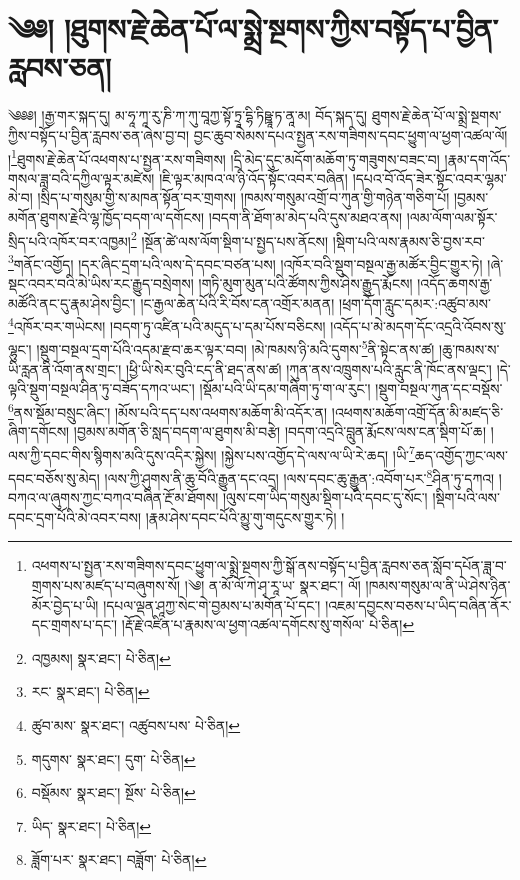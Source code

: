 \setcounter{footnote}{0} 
\chapter{༄༅། །ཐུགས་རྗེ་ཆེན་པོ་ལ་སྨྲེ་སྔགས་ཀྱིས་བསྟོད་པ་བྱིན་རླབས་ཅན།}༄༅༅། །རྒྱ་གར་སྐད་དུ། མ་ཧཱ་ཀཱ་རུ་ཎི་ཀ་ཀུ་བཱཀྱ་སྟོ་ཏྲཱ་དྷི་ཏིཥྛཱ་ཏ་ནཱ་མ། བོད་སྐད་དུ། ཐུགས་རྗེ་ཆེན་པོ་ལ་སྨྲེ་སྔགས་ཀྱིས་བསྟོད་པ་བྱིན་རླབས་ཅན་ཞེས་བྱ་བ། བྱང་ཆུབ་སེམས་དཔའ་སྤྱན་རས་གཟིགས་དབང་ཕྱུག་ལ་ཕྱག་འཚལ་ལོ། །\footnote{འཕགས་པ་སྤྱན་རས་གཟིགས་དབང་ཕྱུག་ལ་སྨྲེ་སྔགས་ཀྱི་སྒོ་ནས་བསྟོད་པ་བྱིན་རླབས་ཅན་སློབ་དཔོན་ཟླ་བ་གྲགས་པས་མཛད་པ་བཞུགས་སོ། །༄། ན་མོ་ལོ་ཀེ་ཤྭ་རཱ་ཡ་  སྣར་ཐང་། ལོ། །ཁམས་གསུམ་ལ་ནི་ཡེ་ཤེས་ཉིན་མོར་བྱེད་པ་ཡི། །དཔལ་ལྡན་ཤཱཀྱ་སེང་གེ་བྱམས་པ་མགོན་པོ་དང་། །འཇམ་དབྱངས་བཅས་པ་ཡིད་བཞིན་ནོར་དང་གྲགས་པ་དང་། །རྡོ་རྗེ་འཛིན་པ་རྣམས་ལ་ཕྱག་འཚལ་དགོངས་སུ་གསོལ་  པེ་ཅིན། }ཐུགས་རྗེ་ཆེན་པོ་འཕགས་པ་སྤྱན་རས་གཟིགས། །དྲི་མེད་དུང་མདོག་མཆོག་ཏུ་གཟུགས་བཟང་བ། །རྣམ་དག་འོད་གསལ་ཟླ་བའི་དཀྱིལ་ལྟར་མཛེས། །ཇི་ལྟར་མཁའ་ལ་ཉི་འོད་སྟོང་འབར་བཞིན། །དཔའ་བོ་འོད་ཟེར་སྟོང་འབར་ལྷམ་མེ་བ། །སྲིད་པ་གསུམ་གྱི་ས་མཁན་སྟོན་བར་གྲགས། །ཁམས་གསུམ་འགྲོ་བ་ཀུན་གྱི་གཉེན་གཅིག་པོ། །བྱམས་མགོན་ཐུགས་རྗེའི་ལྷ་ཁྱོད་བདག་ལ་དགོངས། །བདག་ནི་ཐོག་མ་མེད་པའི་དུས་མཐའ་ནས། །ལམ་ལོག་ལམ་སྟོར་སྲིད་པའི་འཁོར་བར་འཁྱམ།\footnote{འཁྱམས།  སྣར་ཐང་།  པེ་ཅིན། } །སྔོན་ཚེ་ལས་ལོག་སྡིག་པ་སྤྱད་པས་ནོངས། །སྡིག་པའི་ལས་རྣམས་ཅི་བྱས་རབ་\footnote{རང་  སྣར་ཐང་།  པེ་ཅིན། }གནོང་འགྱོད། །དར་ཞིང་དྲག་པའི་ལས་དེ་དབང་བཙན་པས། །འཁོར་བའི་སྡུག་བསྔལ་རྒྱ་མཚོར་བྱིང་གྱུར་ཏེ། །ཞེ་སྡང་འབར་བའི་མེ་ཡིས་རང་རྒྱུད་བསྲེགས། །གཏི་མུག་མུན་པའི་ཚོགས་ཀྱིས་ཤེས་རྒྱུད་རྨོངས། །འདོད་ཆགས་རྒྱ་མཚོའི་ནང་དུ་རྣམ་ཤེས་བྱིང་། །ང་རྒྱལ་ཆེན་པོའི་རི་བོས་ངན་འགྲོར་མནན། །ཕྲག་དོག་རླུང་དམར་:འཚུབ་མས་\footnote{ཚུབ་མས་  སྣར་ཐང་། འཚུབས་པས་  པེ་ཅིན། }འཁོར་བར་གཡེངས། །བདག་ཏུ་འཛིན་པའི་མདུད་པ་དམ་པོས་བཅིངས། །འདོད་པ་མེ་མདག་དོང་འདྲའི་འོབས་སུ་ལྷུང་། །སྡུག་བསྔལ་དྲག་པོའི་འདམ་རྫབ་ཆར་ལྟར་བབ། །མེ་ཁམས་ཉི་མའི་དུགས་\footnote{གདུགས་  སྣར་ཐང་། དུག་  པེ་ཅིན། }ནི་སྟེང་ནས་ཚ། །ཆུ་ཁམས་ས་ཡི་རླན་ནི་འོག་ནས་གྲང་། །ཕྱི་ཡི་སེར་བུའི་ངད་ནི་ཐད་ནས་ཚ། །ཀུན་ནས་འཁྲུགས་པའི་རླུང་ནི་ཁོང་ནས་ལྡང་། །དེ་ལྟའི་སྡུག་བསྔལ་ཤིན་ཏུ་བཟོད་དཀའ་ཡང་། །སྡོམ་པའི་ཡི་དམ་གཞིག་ཏུ་ག་ལ་རུང་། །སྡུག་བསྔལ་ཀུན་དང་བསྡོས་\footnote{བསྡོམས་  སྣར་ཐང་། སྔོས་  པེ་ཅིན། }ནས་སྡོམ་བསྲུང་ཞིང་། །མོས་པའི་དད་པས་འཕགས་མཆོག་མི་འདོར་ན། །འཕགས་མཆོག་འགྲོ་དོན་མི་མཛད་ཅི་ཞིག་དགོངས། །བྱམས་མགོན་ཅི་སླད་བདག་ལ་ཐུགས་མི་བརྩེ། །བདག་འདྲའི་བླུན་རྨོངས་ལས་ངན་སྡིག་པོ་ཆ། །ལས་ཀྱི་དབང་གིས་སྙིགས་མའི་དུས་འདིར་སྐྱེས། །སྐྱེས་པས་འགྱོད་དེ་ལས་ལ་ཡི་རེ་ཆད། །ཡི་\footnote{ཡིད་  སྣར་ཐང་།  པེ་ཅིན། }ཆད་འགྱོད་ཀྱང་ལས་དབང་བཅོས་སུ་མེད། །ལས་ཀྱི་ཤུགས་ནི་ཆུ་བོའི་རྒྱུན་དང་འདྲ། །ལས་དབང་ཆུ་རྒྱུན་:འབོག་པར་\footnote{ཟློག་པར་  སྣར་ཐང་། བཟློག་  པེ་ཅིན། }ཤིན་ཏུ་དཀའ། །བཀའ་ལ་ཞུགས་ཀྱང་བཀའ་བཞིན་རྔོ་མ་ཐོགས། །ལུས་ངག་ཡིད་གསུམ་སྡིག་པའི་དབང་དུ་སོང་། །སྡིག་པའི་ལས་དབང་དྲག་པོའི་མེ་འབར་བས། །རྣམ་ཤེས་དབང་པོའི་མྱུ་གུ་གདུངས་གྱུར་ཏེ། །

